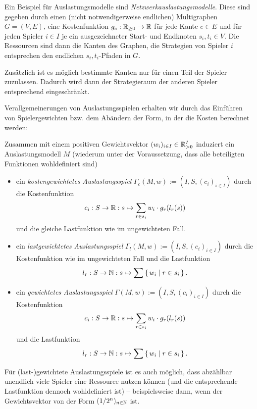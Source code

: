\begin{bsp}
	Ein Beispiel für Auslastungsmodelle sind \emph{Netzwerkauslastungsmodelle}. Diese sind gegeben durch einen (nicht notwendigerweise endlichen) Multigraphen $G=(V,E)$, eine Kostenfunktion $g_e: \mathbb{R}_{\geq 0} \to \mathbb{R}$ für jede Kante $e \in E$ und für jeden Spieler $i \in I$ je ein ausgezeichneter Start- und Endknoten $s_i, t_i \in V$. Die Ressourcen sind dann die Kanten des Graphen, die Strategien von Spieler $i$ entsprechen den endlichen $s_i,t_i$-Pfaden in $G$. 
	
	Zusätzlich ist es möglich bestimmte Kanten nur für einen Teil der Spieler zuzulassen. Dadurch wird dann der Strategieraum der anderen Spieler entsprechend eingeschränkt.
\end{bsp}

Verallgemeinerungen von Auslastungsspielen erhalten wir durch das Einführen von Spielergewichten bzw. dem Abändern der Form, in der die Kosten berechnet werden:

\begin{defn}\label{def:gewAuslastungsspiel}
	Zusammen mit einem positiven Gewichtsvektor $(w_i)_{i\in I} \in \mathbb{R}_{> 0}^I$ induziert ein Auslastungsmodell $M$ (wiederum unter der Voraussetzung, dass alle beteiligten Funktionen wohldefiniert sind)
	\begin{itemize}
		\item ein \emph{kostengewichtetes Auslastungsspiel} $\Gamma_c(M, w) := (I, S, (c_i)_{i \in I})$ durch die Kostenfunktion
		\[c_i: S \to \mathbb{R}: s \mapsto \sum_{r \in s_i} w_i\cdot g_r(l_r(s)) \]
		und die gleiche Lastfunktion wie im ungewichteten Fall.
		\item ein \emph{lastgewichtetes Auslastungsspiel} $\Gamma_l(M, w) := (I, S, (c_i)_{i \in I})$ durch die Kostenfunktion wie im ungewichteten Fall und die Lastfunktion 
		\[l_r: S \to \mathbb{N}: s \mapsto \sum\set{w_i | r \in s_i}.\]
		\item ein \emph{gewichtetes Auslastungsspiel} $\Gamma(M, w) := (I, S, (c_i)_{i \in I})$ durch die Kostenfunktion
		\[c_i: S \to \mathbb{R}: s \mapsto \sum_{r \in s_i} w_i\cdot g_r(l_r(s)) \]
		und die Lastfunktion 
		\[l_r: S \to \mathbb{N}: s \mapsto \sum\set{w_i | r \in s_i}.\]
	\end{itemize}	
\end{defn}

\begin{beob}
	Für (last-)gewichtete Auslastungsspiele ist es auch möglich, dass abzählbar unendlich viele Spieler eine Ressource nutzen können (und die entsprechende Lastfunktion dennoch wohldefiniert ist) -- beispielsweise dann, wenn der Gewichtsvektor von der Form $(1/2^n)_{n \in \mathbb{N}}$ ist.
\end{beob}

